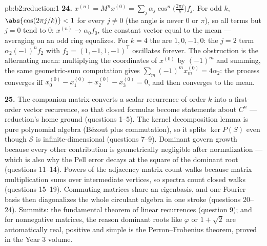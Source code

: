 \begin{solution}{pb:b2:reduction:1}
\textbf{24.} $x^{(n)} = M^nx^{(0)} = \sum_j
\alpha_j\cos^n\bigl(\tfrac{2\pi j}k\bigr)f_j$. For odd $k$,
$\abs{\cos(2\pi j/k)} < 1$ for every $j \neq 0$ (the angle is
never $0$ or $\pi$), so all terms but $j = 0$ tend to $0$:
$x^{(n)} \to \alpha_0 f_0$, the constant vector equal to the
mean --- averaging on an odd ring equalizes. For $k = 4$ the
 are $1, 0, -1, 0$: the $j = 2$ term
$\alpha_2(-1)^nf_2$ with $f_2 = (1, -1, 1, -1)^{\mathsf T}$
oscillates forever. The obstruction is the alternating mean:
multiplying the coordinates of $x^{(0)}$ by $(-1)^m$ and
summing, the same geometric-sum computation gives $\sum_m
(-1)^mx^{(0)}_m = 4\alpha_2$: the process converges iff
$x^{(0)}_0 - x^{(0)}_1 + x^{(0)}_2 - x^{(0)}_3 = 0$, and then
converges to the mean.

\textbf{25.} The companion matrix converts a scalar recurrence
of order $k$ into a first-order vector recurrence, so that
closed formulas become statements about $C^n$ --- reduction's
home ground (questions 1--5). The kernel decomposition lemma is
pure polynomial algebra (Bézout plus commutation), so it splits
$\ker P(S)$ even though $\mathcal{S}$ is infinite-dimensional
(questions 7--9). Dominant  govern growth because
every other contribution is geometrically negligible after
normalization --- which is also why the Pell error decays at the
square of the dominant root (questions 11--14). Powers of the
adjacency matrix count walks because matrix multiplication sums
over intermediate vertices, so spectra count closed walks
(questions 15--19). Commuting matrices share an eigenbasis, and
one Fourier basis then diagonalizes the whole circulant algebra
in one stroke (questions 20--24). Summits: the fundamental
theorem of linear recurrences (question 9); and for nonnegative
matrices, the reason dominant roots like $\varphi$ or $1 +
\sqrt2$ are automatically real, positive and simple is the
Perron--Frobenius theorem, proved in the Year 3 volume.
\end{solution}
